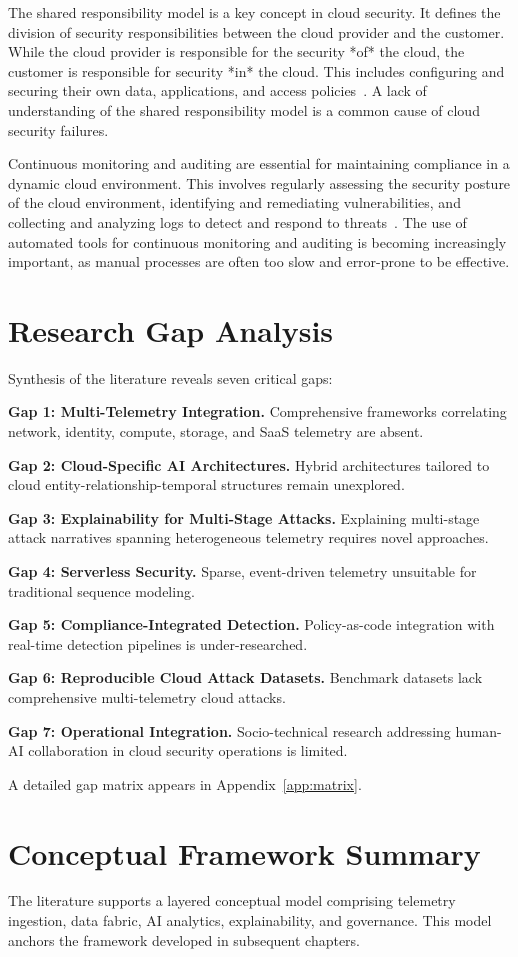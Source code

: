The shared responsibility model is a key concept in cloud security. It defines the division of security responsibilities between the cloud provider and the customer. While the cloud provider is responsible for the security *of* the cloud, the customer is responsible for security *in* the cloud. This includes configuring and securing their own data, applications, and access policies~\cite{crowdstrike2024shared}. A lack of understanding of the shared responsibility model is a common cause of cloud security failures.

Continuous monitoring and auditing are essential for maintaining compliance in a dynamic cloud environment. This involves regularly assessing the security posture of the cloud environment, identifying and remediating vulnerabilities, and collecting and analyzing logs to detect and respond to threats~\cite{hyperglance2024monitoring}. The use of automated tools for continuous monitoring and auditing is becoming increasingly important, as manual processes are often too slow and error-prone to be effective.

\section{Research Gap Analysis}\label{sec:lit-gaps}
Synthesis of the literature reveals seven critical gaps:

\textbf{Gap 1: Multi-Telemetry Integration.} Comprehensive frameworks correlating network, identity, compute, storage, and SaaS telemetry are absent.

\textbf{Gap 2: Cloud-Specific AI Architectures.} Hybrid architectures tailored to cloud entity-relationship-temporal structures remain unexplored.

\textbf{Gap 3: Explainability for Multi-Stage Attacks.} Explaining multi-stage attack narratives spanning heterogeneous telemetry requires novel approaches.

\textbf{Gap 4: Serverless Security.} Sparse, event-driven telemetry unsuitable for traditional sequence modeling.

\textbf{Gap 5: Compliance-Integrated Detection.} Policy-as-code integration with real-time detection pipelines is under-researched.

\textbf{Gap 6: Reproducible Cloud Attack Datasets.} Benchmark datasets lack comprehensive multi-telemetry cloud attacks.

\textbf{Gap 7: Operational Integration.} Socio-technical research addressing human-AI collaboration in cloud security operations is limited.

A detailed gap matrix appears in Appendix~\ref{app:matrix}.

\section{Conceptual Framework Summary}
The literature supports a layered conceptual model comprising telemetry ingestion, data fabric, AI analytics, explainability, and governance. This model anchors the framework developed in subsequent chapters.
